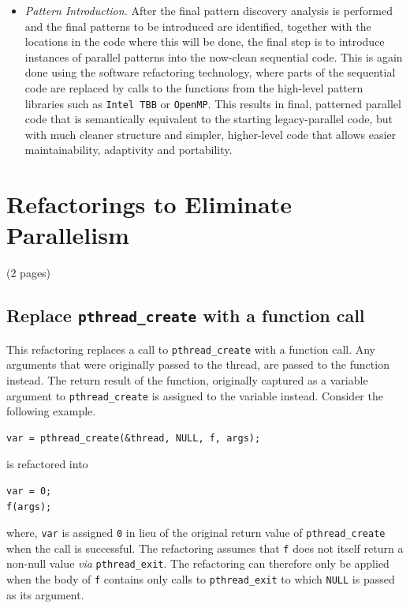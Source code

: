 \begin{itemize}
\item \emph{Pattern Introduction.} After the final pattern discovery analysis is performed and the final patterns to be introduced are identified, together with the locations in the code where this will be done, the final step is to introduce instances of parallel patterns into the now-clean sequential code. This is again done using the software refactoring technology, where parts of the sequential code are replaced by calls to the functions from the high-level pattern libraries such as \lstinline{Intel TBB} or \lstinline{OpenMP}. This results in final, patterned parallel code that is semantically equivalent to the starting legacy-parallel code, but with much cleaner structure and simpler, higher-level code that allows easier maintainability, adaptivity and portability.
\end{itemize}

\section{Refactorings to Eliminate Parallelism} (2 pages)

\subsection{Replace \lstinline|pthread_create| with a function call}

This refactoring replaces a call to \lstinline|pthread_create| with a function call. Any arguments that were originally passed to the thread, are passed to the function instead. The return result of the function, originally captured as a variable argument to \lstinline|pthread_create| is assigned to the variable instead. Consider the following example.

\begin{lstlisting}[frame=single]
var = pthread_create(&thread, NULL, f, args);
\end{lstlisting}

\noindent
is refactored into

\begin{lstlisting}[frame=single]
var = 0;
f(args);
\end{lstlisting}

\noindent
where, \texttt{var} is assigned \texttt{0} in lieu of the original return value of \lstinline|pthread_create| when the call is successful. The refactoring assumes that \lstinline|f| 
does not itself return a non-null value \emph{via} \lstinline|pthread_exit|. The refactoring can therefore only be applied when the body of \lstinline|f| contains only calls to \lstinline|pthread_exit| to which \lstinline|NULL| is passed as its argument. %

